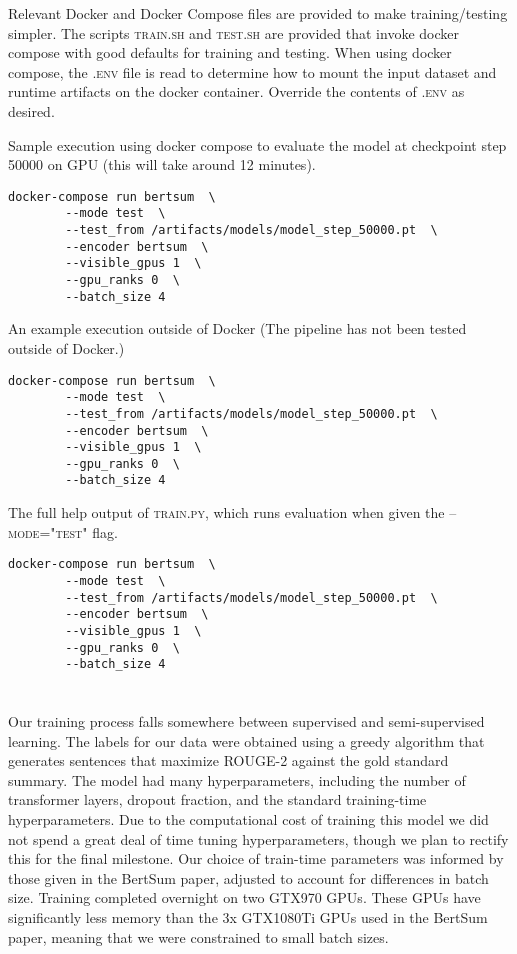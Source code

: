 \documentclass[12pt]{article}
\begin{document}
Relevant Docker and Docker Compose files are provided to make
training/testing simpler. The scripts \textsc{train.sh} and
\textsc{test.sh} are provided that invoke docker compose with good
defaults for training and testing. When using docker compose, the
\textsc{.env} file is read to determine how to mount the input dataset
and runtime artifacts on the docker container. Override the contents
of \textsc{.env} as desired.
\newline

Sample execution using docker compose to evaluate the model at
checkpoint step 50000 on GPU (this will take around 12 minutes).

\begin{verbatim}
docker-compose run bertsum  \
		--mode test  \
		--test_from /artifacts/models/model_step_50000.pt  \
		--encoder bertsum  \
		--visible_gpus 1  \
		--gpu_ranks 0  \
		--batch_size 4
\end{verbatim}

An example execution outside of Docker (The pipeline has not been
tested outside of Docker.)

\begin{verbatim}
docker-compose run bertsum  \
		--mode test  \
		--test_from /artifacts/models/model_step_50000.pt  \
		--encoder bertsum  \
		--visible_gpus 1  \
		--gpu_ranks 0  \
		--batch_size 4
\end{verbatim}

The full help output of \textsc{train.py}, which runs evaluation when
given the \textsc{--mode="test"} flag.

\begin{verbatim}
docker-compose run bertsum  \
		--mode test  \
		--test_from /artifacts/models/model_step_50000.pt  \
		--encoder bertsum  \
		--visible_gpus 1  \
		--gpu_ranks 0  \
		--batch_size 4
\end{verbatim}

\section{}

\subsection{}

Our training process falls somewhere between supervised and
semi-supervised learning. The labels for our data were obtained using
a greedy algorithm that generates sentences that maximize ROUGE-2
against the gold standard summary. The model had many hyperparameters,
including the number of transformer layers, dropout fraction, and the
standard training-time hyperparameters. Due to the computational cost
of training this model we did not spend a great deal of time tuning
hyperparameters, though we plan to rectify this for the final
milestone. Our choice of train-time parameters was informed by those
given in the BertSum paper, adjusted to account for differences in
batch size. Training completed overnight on two GTX970 GPUs. These
GPUs have significantly less memory than the 3x GTX1080Ti GPUs used in
the BertSum paper, meaning that we were constrained to small batch
sizes.
\end{document}
